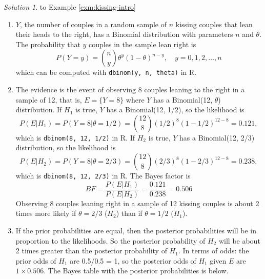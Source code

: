 \documentclass[
]{book}
\theoremstyle{definition}
\theoremstyle{definition}
\theoremstyle{definition}
\theoremstyle{remark}
\newtheorem*{solution}{Solution}
\begin{document}
\begin{solution}
{}
to Example \ref{exm:kissing-intro}
\end{solution}

\begin{enumerate}
\def\labelenumi{\arabic{enumi}.}
\item
  \(Y\), the number of couples in a random sample of \(n\) kissing couples that lean their heads to the right, has a Binomial distribution with parameters \(n\) and \(\theta\). The probability that \(y\) couples in the sample lean right is
  \[
  P(Y = y) = \binom{n}{y}\theta^y(1-\theta)^{n-y}, \quad y = 0, 1, 2, \ldots, n
  \]
  which can be computed with \texttt{dbinom(y,\ n,\ theta)} in R.
\item
  The evidence is the event of observing 8 couples leaning to the right in a sample of 12, that is, \(E=\{Y=8\}\) where \(Y\) has a Binomial(12, \(\theta\)) distribution. If \(H_1\) is true, \(Y\) has a Binomial(12, 1/2), so the likelihood is
  \[
  P(E|H_1) = P(Y = 8|\theta = 1/2) = \binom{12}{8}(1/2)^8(1-1/2)^{12-8} = 0.121,
  \]
  which is \texttt{dbinom(8,\ 12,\ 1/2)} in R. If \(H_2\) is true, \(Y\) has a Binomial(12, 2/3) distribution, so the likelihood is
  \[
  P(E|H_2) = P(Y = 8|\theta = 2/3) = \binom{12}{8}(2/3)^8(1-2/3)^{12-8} = 0.238,
  \]
  which is \texttt{dbinom(8,\ 12,\ 2/3)} in R. The Bayes factor is
  \[
  BF = \frac{P(E|H_1)}{P(E|H_2)} = \frac{0.121}{0.238} = 0.506
  \]
  Observing 8 couples leaning right in a sample of 12 kissing couples is about 2 times more likely if \(\theta=2/3\) (\(H_2\)) than if \(\theta = 1/2\) (\(H_1\)).
\item
  If the prior probabilities are equal, then the posterior probabilities will be in proportion to the likelihoods. So the posterior probability of \(H_2\) will be about 2 times greater than the posterior probability of \(H_1\). In terms of odds: the prior odds of \(H_1\) are 0.5/0.5 = 1, so the posterior odds of \(H_1\) given \(E\) are \(1\times 0.506\). The Bayes table with the posterior probabilities is below.


\end{enumerate}
\end{document}
